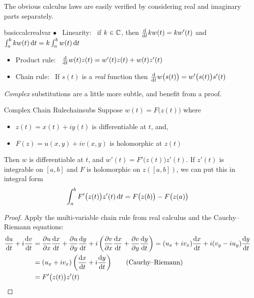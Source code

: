 The obvious calculus laws are easily verified by considering real and imaginary parts separately.

\begin{lemm}{}{basiccalcrealvar}
$\bullet$ \ Linearity: \ if $k\in\C$, then $\diff tkw(t)=kw'(t)$ and $\int_a^bkw(t)\,\dt=k\int_a^bw(t)\,\dt$
\begin{itemize}
  \item Product rule: \ $\diff tw(t)z(t)=w'(t)z(t)+w(t)z'(t)$
  \item Chain rule: \ If $s(t)$ is a \emph{real} function then $\diff tw\bigl(s(t)\bigr)=w'\bigl(s(t)\bigr)s'(t)$
\end{itemize}
\end{lemm}

\emph{Complex} substitutions are a little more subtle, and benefit from a proof.

\begin{lemm}{Complex Chain Rule}{chainsubs}
Suppose $w(t)=F\bigl(z(t)\bigr)$ where
\begin{itemize}
  \item $z(t)=x(t)+iy(t)$ is differentiable at $t$, and,
  \item $F(z)=u(x,y)+iv(x,y)$ is holomorphic at $z(t)$
\end{itemize}
Then $w$ is differentiable at $t$, and $w'(t)=F'\bigl(z(t)\bigr)z'(t)$.\smallbreak
If $z'(t)$ is integrable on $[a,b]$ and $F$ is holomorphic on $z([a,b])$, we can put this in integral form
\[\int_a^bF'\bigl(z(t)\bigr)z'(t)\,\dt %
=F\bigl(z(b)\bigr)-F\bigl(z(a)\bigr)\]
\end{lemm}



\begin{proof}
Apply the multi-variable chain rule from real calculus and the Cauchy--Riemann equations:
\begin{align*}
\diff[u]{t}+i\diff[v]{t}&=\partials[u]{x}\diff[x]{t}+\partials[u]{y}\diff[y]t
+i\left(\partials[v]{x}\diff[x]{t}+\partials[v]{y}\diff[y]{t}\right) =(u_x+iv_x)\diff[x]{t}+i(v_y-iu_y)\diff[y]{t} \\
&=(u_x+iv_x)\left(\diff[x]{t}+i\diff[y]{t}\right)\tag{Cauchy--Riemann}\\
&=F'\bigl(z(t)\bigr)z'(t)\tag*{\qedhere}
\end{align*}
\end{proof}

